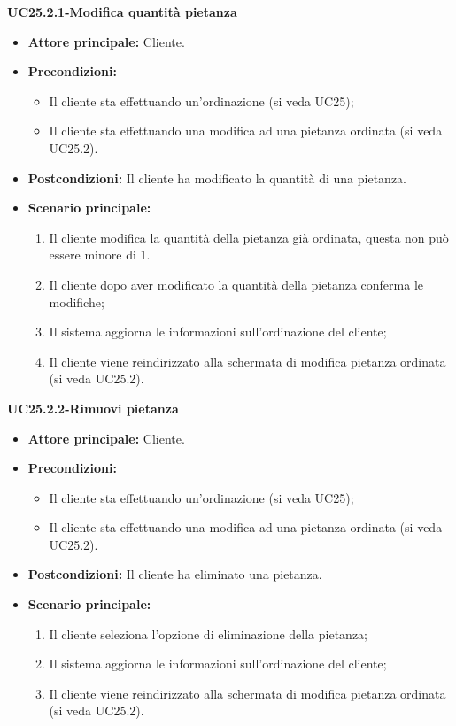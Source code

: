 \textbf{UC25.2.1-Modifica quantità pietanza}
\begin{itemize}
\item \textbf{Attore principale:} Cliente.
\item \textbf{Precondizioni:} 
\begin{itemize}
    \item Il cliente sta effettuando un'ordinazione (si veda UC25);
    \item Il cliente sta effettuando una modifica ad una pietanza ordinata (si veda UC25.2).
\end{itemize}
\item \textbf{Postcondizioni:} Il cliente ha modificato la quantità di una pietanza.
\item \textbf{Scenario principale:}
\begin{enumerate}
    \item Il cliente modifica la quantità della pietanza già ordinata, questa non può essere minore di 1.
    \item Il cliente dopo aver modificato la quantità della pietanza conferma le modifiche;
    \item Il sistema aggiorna le informazioni sull'ordinazione del cliente;
    \item Il cliente viene reindirizzato alla schermata di modifica pietanza ordinata (si veda UC25.2).
\end{enumerate}
\end{itemize}

\textbf{UC25.2.2-Rimuovi pietanza}
\begin{itemize}
\item \textbf{Attore principale:} Cliente.
\item \textbf{Precondizioni:} 
\begin{itemize}
    \item Il cliente sta effettuando un'ordinazione (si veda UC25);
    \item Il cliente sta effettuando una modifica ad una pietanza ordinata (si veda UC25.2).
\end{itemize}
\item \textbf{Postcondizioni:} Il cliente ha eliminato una pietanza.
\item \textbf{Scenario principale:}
\begin{enumerate}
    \item Il cliente seleziona l'opzione di eliminazione della pietanza;
    \item Il sistema aggiorna le informazioni sull'ordinazione del cliente;
    \item Il cliente viene reindirizzato alla schermata di modifica pietanza ordinata (si veda UC25.2).
\end{enumerate}
\end{itemize}


